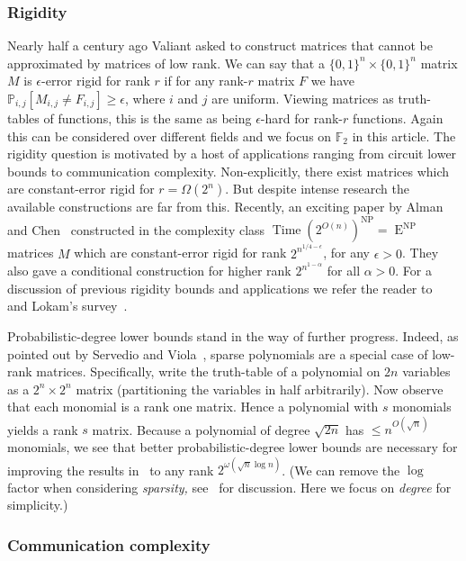 \documentclass[11pt]{article}
\DeclareMathOperator{\Time}{\mathrm{Time}}  %
\DeclareMathOperator{\NP}{\mathrm{NP}}  %
\DeclareMathOperator{\EEE}{\mathrm{E}}  %
\newcommand{\zo}{\{0, 1\}}
\newcommand{\F}{\mathbb{F}}
\renewcommand{\P}{\mathbb{P}}
\newcommand{\e}{\epsilon}
\begin{document}
\subsubsection{Rigidity}
\label{sec:rigidity}   %

%
Nearly half a century ago  %
Valiant \cite{Val77} asked to construct
matrices that cannot be approximated by matrices %
of low rank.  %
We can say that a $\zo^{n}\times\zo^{n}$ matrix $M$ is $\e$-error
rigid for rank $r$ if for any rank-$r$ matrix $F$ we have 
$\P_{i,j}[M_{i,j}\ne F_{i,j}]\ge\e$,
where $i$ and $j$ are uniform. Viewing matrices as truth-tables
of functions, this is the same as  %
being  %
$\e$-hard for rank-$r$ functions.
Again this can be considered over different fields and we focus on
$\F_{2}$ in this %
article.  %
The rigidity question is motivated by a host
of applications ranging from circuit lower bounds to communication
complexity. Non-explicitly, there exist matrices which are constant-error
rigid for $r=\Omega(2^{n})$. But despite intense research the available
constructions are far from this. Recently, an exciting %
paper  %
%
%
%
by Alman and Chen~\cite{AlmanC19} 
constructed in the complexity class $\Time(2^{O(n)})^{\NP}=\EEE^{\NP}$
matrices $M$ which are constant-error rigid for rank $2^{n^{1/4-\e}}$,
for any $\e>0$. They also gave a conditional construction for higher
rank $2^{n^{1-\alpha}}$ for all $\alpha>0$. For a discussion of
previous rigidity bounds and applications we refer the reader to~\cite{AlmanC19}
and Lokam's survey~\cite{Lokam09}.

Probabilistic-degree lower bounds stand in the way of further progress.
Indeed, as pointed out by Servedio and Viola~\cite{ServedioV-sparse},
sparse polynomials are a special case of low-rank matrices. Specifically,
write the truth-table of a polynomial on $2n$ variables as a $2^{n}\times2^{n}$
matrix (partitioning the variables in half arbitrarily). Now observe
that each monomial is a rank one matrix. Hence a polynomial with $s$
monomials yields a rank $s$ matrix. Because a polynomial of degree
$\sqrt{2n}$ has $\le n^{O(\sqrt{n})}$ monomials, we see that better
probabilistic-degree lower bounds are necessary for improving the
results in~\cite{AlmanC19} to any rank $2^{\omega(\sqrt{n}\log n)}$.
(We can remove the $\log$ factor when considering \emph{sparsity,
}see~\cite{ServedioV-sparse} for discussion. Here we focus on \emph{degree}
for simplicity.)

\subsubsection{Communication complexity}
\end{document}
